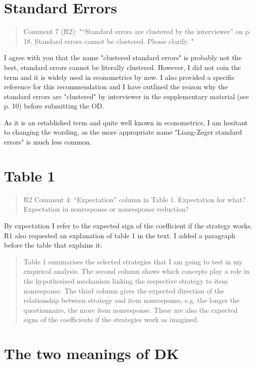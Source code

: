 \documentclass[a4paper, 12pt]{article}
\begin{document}
\section{Standard Errors}

\begin{quotation}
Comment 7 (R2): "“Standard errors are clustered by the interviewer” on p. 18. Standard errors cannot be clustered. Please clarify. "
\end{quotation}

I agree with you that the name "clustered standard errors" is probably not the best, standard errors cannot be literally clustered. However, I did not coin the term and it is widely used in econometrics by now. I also provided a specific reference for this recommendation and I have outlined the reason why the standard errors are "clustered" by interviewer in the supplementary material (see p. 10) before submitting the OD. 

As it is an established term and quite well known in econometrics, I am hesitant to changing the wording, as the more appropriate name "Liang-Zeger standard errors" is much less common. 

\section{Table 1}

\begin{quotation}
R2 Comment 4: “Expectation” column in Table 1. Expectation for what? Expectation in nonresponse or nonresponse reduction?
\end{quotation}

By expectation I refer to the expected sign of the coefficient if the strategy works. R1 also requested an explanation of table 1 in the text. I added a paragraph before the table that explains it:

\begin{quotation}
Table 1 summarises the selected strategies that I am going to test in my empirical analysis. The second column shows which concepts play a role in the hypothesized mechanism linking the respective strategy to item nonresponse. The third column gives the expected direction of the relationship between strategy and item nonresponse, e.g. the longer the questionnaire, the more item nonresponse. These are also the expected signs of the coefficients if the strategies work as imagined.
\end{quotation}


\section{The two meanings of DK}
\end{document}
